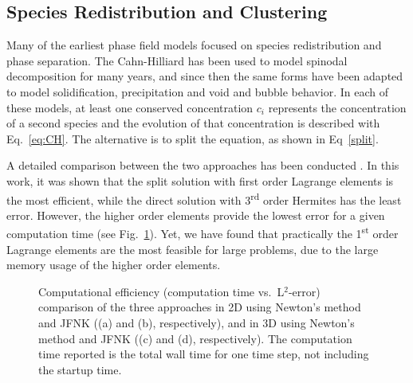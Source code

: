 \documentclass[letter,12pt,fleqn]{article}
\begin{document}
\subsection{Species Redistribution and Clustering}
Many of the earliest phase field models focused on species redistribution and phase separation. The Cahn-Hilliard has been used to model spinodal decomposition for many years, and since then the same forms have been adapted to model solidification, precipitation and void and bubble behavior. In each of these models, at least one conserved concentration $c_i$ represents the concentration of a second species and the evolution of that concentration is described with Eq.~\eqref{eq:CH}. The alternative is to split the equation, as shown in Eq~\eqref{split}.

 A detailed comparison between the two approaches has been conducted \citep{zhang2012}. In this work, it was shown that the split solution with first order Lagrange elements is the most efficient, while the direct solution with 3\textsuperscript{rd} order Hermites has the least error. However, the higher order  elements provide the lowest error for a given computation time (see Fig.~\ref{fig:CH_time_error}). Yet, we have found that practically the 1\textsuperscript{st} order Lagrange elements are the most feasible for large problems, due to the large memory usage of the higher order elements.
\begin{figure}[t]
\centering
\caption{Computational efficiency (computation time vs.\ L$^2$-error) comparison of the three approaches in 2D using Newton's method and JFNK ((a) and (b), respectively), and in 3D using Newton's method and JFNK ((c) and (d), respectively). The computation time reported is the total wall time for one time step, not including the startup time. \label{fig:CH_time_error}}
\end{figure}
\end{document}
